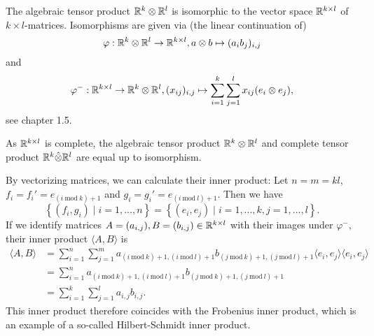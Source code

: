 \begin{ex} \label{ex:isomorphism tensor product Rp}
    The algebraic tensor product $\mathbb{R}^k \otimes \mathbb{R}^l$ is isomorphic to the vector space $\mathbb{R}^{k \times l}$ of $k \times l$-matrices. Isomorphisms are given via (the linear continuation of)
    \begin{equation*}
        \varphi: \mathbb{R}^k \otimes \mathbb{R}^l \to \mathbb{R}^{k \times l}, a \otimes b \mapsto (a_i b_j)_{i, j}
    \end{equation*}
    and
    \begin{equation*}
        \varphi^{-}: \mathbb{R}^{k \times l} \to \mathbb{R}^k \otimes \mathbb{R}^l, (x_{ij})_{i, j} \mapsto \sum\limits_{i = 1}^k \sum\limits_{j = 1}^l x_{ij} (e_i \otimes e_j),
    \end{equation*}
    see \cite{ryan2002banach} chapter 1.5. 
    
    As $\mathbb{R}^{k \times l}$ is complete, the algebraic tensor product $\mathbb{R}^k \otimes \mathbb{R}^l$ and complete tensor product $\mathbb{R}^k \hat{\otimes} \mathbb{R}^l$ are equal up to isomorphism.

    By vectorizing matrices, we can calculate their inner product: Let $n=m=kl$, $f_i = f_i' = e_{(i \ \mathrm{mod} \ k)+1}$ and $g_i = g_i' = e_{(i \ \mathrm{mod} \ l)+1}$. Then we have 
    \[ \left\{(f_i, g_i) \mid i=1,...,n \right\} = \left\{(e_i, e_j) \mid i=1, ..., k, j=1, ..., l\right\}. \]
    If we identify matrices $A = (a_{i, j}), B = (b_{i, j}) \in \mathbb{R}^{k \times l}$ with their images under $\varphi^{-}$, their inner product $\langle A, B \rangle$ is
    \begin{align*} 
        \langle A, B \rangle 
        & = \sum\limits_{i=1}^n \sum\limits_{j=1}^m  a_{(i \ \mathrm{mod} \ k)+1, (i \ \mathrm{mod} \ l)+1} b_{(j \ \mathrm{mod} \ k)+1, (j \ \mathrm{mod} \ l)+1} \langle e_i, e_j\rangle \langle e_{i}, e_{j} \rangle \\
        & = \sum\limits_{i=1}^n a_{(i \ \mathrm{mod} \ k)+1, (i \ \mathrm{mod} \ l)+1} b_{(j \ \mathrm{mod} \ k)+1, (j \ \mathrm{mod} \ l)+1} \\
        & = \sum\limits_{i=1}^k \sum\limits_{j=1}^l a_{i, j} b_{i, j}.
    \end{align*}
    This inner product therefore coincides with the Frobenius inner product, which is an example of a so-called Hilbert-Schmidt inner product.
\end{ex}
